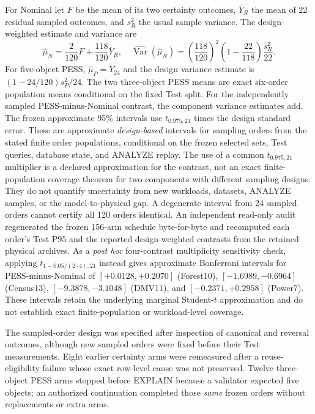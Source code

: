 \documentclass[sigconf, nonacm]{acmart}
\begin{document}
For Nominal let \(F\) be the mean of its two certainty outcomes,
\(\overline Y_R\) the mean of 22 residual sampled outcomes,
and \(s_R^2\) the usual sample variance. The design-weighted
estimate and variance are
\begin{equation}
\label{eq:design}
\widehat\mu_N=\frac{2}{120}F+\frac{118}{120}\overline Y_R,
\quad
\widehat{\operatorname{Var}}(\widehat\mu_N)=
\left(\frac{118}{120}\right)^2
\left(1-\frac{22}{118}\right)\frac{s_R^2}{22}.
\end{equation}
For five-object PESS, \(\widehat\mu_P=\overline Y_{24}\)
and the design variance estimate is \((1-24/120)s_P^2/24\).
The two three-object PESS means are exact six-order
population means conditional on the fixed Test split.
For the independently sampled PESS-minus-Nominal contrast,
the component variance estimates add. The frozen approximate
95\% intervals use \(t_{0.975,21}\) times the design standard
error. These are approximate \emph{design-based} intervals for
sampling orders from the stated finite order populations,
conditional on the frozen selected sets, Test queries, database
state, and ANALYZE replay. The use of a common
$t_{0.975,21}$ multiplier is a declared approximation for
the contrast, not an exact finite-population coverage theorem
for two components with different sampling designs.
They do not quantify uncertainty from new workloads,
datasets, ANALYZE samples, or the model-to-physical gap.
A degenerate interval
from 24 sampled orders cannot certify all 120 orders identical.
An independent read-only audit regenerated the frozen
156-arm schedule byte-for-byte and recomputed each order's
Test P95 and the reported design-weighted contrasts from
the retained physical archives. As a \emph{post hoc}
four-contrast multiplicity sensitivity check, applying
$t_{1-0.05/(2\cdot4),21}$ instead gives approximate
Bonferroni intervals for PESS-minus-Nominal of
$[+0.0128,+0.2070]$ (Forest10),
$[-1.6989,-0.6964]$ (Census13),
$[-9.3878,-3.1048]$ (DMV11), and
$[-0.2371,+0.2958]$ (Power7).
These intervals retain the underlying marginal
Student-$t$ approximation and do not establish exact
finite-population or workload-level coverage.

The sampled-order design was specified after inspection of
canonical and reversal outcomes, although new sampled orders
were fixed before their Test measurements. Eight earlier certainty
arms were remeasured after a reuse-eligibility failure whose
exact row-level cause was not preserved. Twelve three-object
PESS arms stopped before EXPLAIN because a validator expected
five objects; an authorized continuation completed those
\emph{same} frozen orders without replacements or extra arms.
\end{document}
